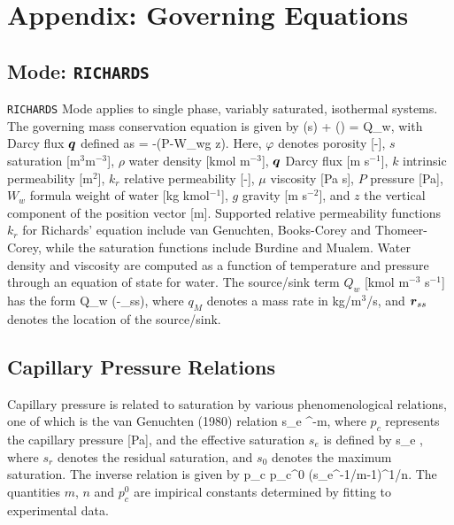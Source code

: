 \section{Appendix: Governing Equations}

\setcounter{equation}{0}

\subsection{Mode: {\tt RICHARDS}}

{\tt RICHARDS} Mode applies to single phase, variably saturated, isothermal systems. The governing mass conservation equation is given by
\EQ
{}\left(\varphi s\rho\right) + \bnabla\cdot\left(\rho\bq\right) = Q_w,
\EN
with Darcy flux $\boldsymbol{q}$ defined as
\EQ
\bq = -\bnabla\left(P-W_w\rho g z\right).
\EN
Here, $\varphi$ denotes porosity [-], 
$s$ saturation [m$^3$m$^{-3}$], 
$\rho$ water density [kmol m$^{-3}$], 
$\boldsymbol{q}$ Darcy flux [m s$^{-1}$], 
$k$ intrinsic permeability [m$^2$], 
$k_r$ relative permeability [-], 
$\mu$ viscosity [Pa s], 
$P$ pressure [Pa], 
$W_w$ formula weight of water [kg kmol$^{-1}$], 
$g$ gravity [m s$^{-2}$], and 
$z$ the vertical component of the position vector [m].  
Supported relative permeability functions $k_r$ for Richards' equation include van Genuchten, Books-Corey and Thomeer-Corey, while the saturation functions include Burdine and Mualem.  Water density and viscosity are computed as a function of temperature and pressure through an equation of state for water. The source/sink term $Q_w$ [kmol m$^{-3}$ s$^{-1}$] has the form
\EQ
Q_w \eq {} \delta(\br-\br_{ss}),
\EN
where $q_M$ denotes a mass rate in kg/m$^{3}$/s, and $\boldsymbol{r}_{ss}$ denotes the location of the source/sink.

\subsection{Capillary Pressure Relations}

Capillary pressure is related to saturation by various 
phenomenological relations, one of which is the van Genuchten 
(1980) relation 
\EQ\label{seff}
s_e \eq {}^{-m}, 
\EN 
where $p_c$ represents the capillary pressure [Pa], and the effective saturation $s_e$ is defined by 
\EQ 
s_e \eq {}, 
\EN 
where $s_r$ denotes the residual saturation, and $s_0$ denotes 
the maximum saturation. 
The inverse relation is given by
\EQ
p_c \eq p_c^0 \left(s_e^{-1/m}-1\right)^{1/n}.
\EN
The quantities $m$, $n$ and $p_c^0$ are impirical constants determined by fitting to experimental data.

